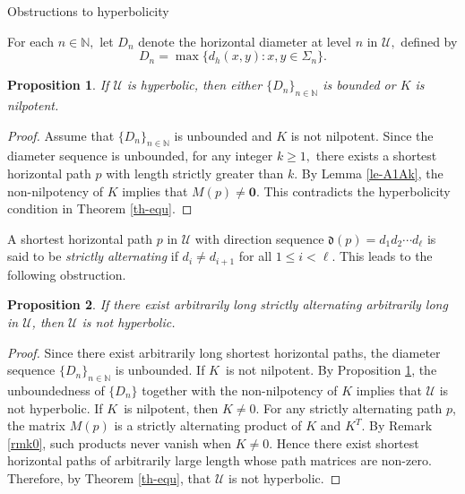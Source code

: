 \documentclass[reqno]{amsart}
\makeatletter
\theoremstyle{plain}
\newtheorem{proposition}{Proposition}
\numberwithin{equation}{section}
\renewcommand{\subsection}{\@startsection{subsection}{2}  \z@{.5\linespacing\@plus.7\linespacing}{.5\linespacing}  {\normalfont\bfseries}}
\makeatother
\begin{document}
\bigskip

\subsection{Obstructions to hyperbolicity}

For each $n\in \mathbb{N},$ let $D_{n}$ denote the horizontal diameter at
level $n$ in $\mathcal{U},$ defined by%
\begin{equation*}
D_{n}=\max \{d_{h}(x,y):x,y\in \Sigma _{n}\}.
\end{equation*}

\begin{proposition}
\label{prop-nil}If $\mathcal{U}$ is hyperbolic, then either $\{D_{n}\}_{n\in 
\mathbb{N}}$ is bounded or $K$ is nilpotent.
\end{proposition}

\begin{proof}
Assume that $\{D_{n}\}_{n\in \mathbb{N}}$ is unbounded and $K$ is not
nilpotent. Since the diameter sequence is unbounded, for any integer $k\geq
1,$ there exists a shortest horizontal path $p$ with length strictly greater
than $k$. By Lemma \ref{le-A1Ak}, the non-nilpotency of $K$ implies that $%
M(p)\neq \boldsymbol{0}$. This contradicts the hyperbolicity condition in
Theorem \ref{th-equ}.
\end{proof}

A shortest horizontal path $p$ in $\mathcal{U}$ with direction sequence $%
\mathfrak{d}(p)=d_{1}d_{2}\cdots d_{\ell }$ is said to be \emph{strictly
alternating} if $d_{i}\neq d_{i+1}$ for all $1\leq i<\ell $. This leads to
the following obstruction.

\begin{proposition}
\label{prop-arbi}If there exist arbitrarily long strictly alternating
arbitrarily long in $\mathcal{U}$, then $\mathcal{U}$ is not hyperbolic.
\end{proposition}

\begin{proof}
Since there exist arbitrarily long shortest horizontal paths, the diameter
sequence $\{D_{n}\}_{n\in \mathbb{N}}$ is unbounded.\newline
If $K$\ is not nilpotent. By Proposition \ref{prop-nil}, the unboundedness
of $\{D_{n}\}$ together with the non-nilpotency of $K$ implies that $%
\mathcal{U}$ is not hyperbolic.\newline
If $K$\ is nilpotent, then $K\neq 0$. For any strictly alternating path $p$,
the matrix $M(p)$ is a strictly alternating product of $K$ and $K^{T}$. By
Remark \ref{rmk0}, such products never vanish when $K\neq 0$. Hence there
exist shortest horizontal paths of arbitrarily large length whose path
matrices are non-zero. Therefore, by Theorem \ref{th-equ}, that $\mathcal{U}$
is not hyperbolic.
\end{proof}
\end{document}
